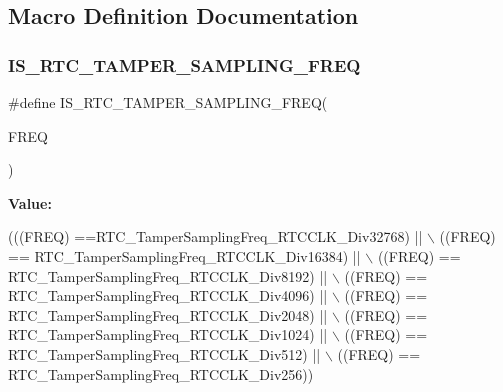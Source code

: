 \subsection{Macro Definition Documentation}
\mbox{\label{group__RTC__Tamper__Sampling__Frequencies__Definitions_gaf355fb7bd95d7cffb14a212b4507cbdb}} 
\subsubsection{I\+S\+\_\+\+R\+T\+C\+\_\+\+T\+A\+M\+P\+E\+R\+\_\+\+S\+A\+M\+P\+L\+I\+N\+G\+\_\+\+F\+R\+EQ}
{\footnotesize\ttfamily \#define I\+S\+\_\+\+R\+T\+C\+\_\+\+T\+A\+M\+P\+E\+R\+\_\+\+S\+A\+M\+P\+L\+I\+N\+G\+\_\+\+F\+R\+EQ(\begin{DoxyParamCaption}\item[{}]{F\+R\+EQ }\end{DoxyParamCaption})}

{\bfseries Value\+:}
\begin{DoxyCode}
(((FREQ) ==RTC_TamperSamplingFreq_RTCCLK_Div32768) || \(\backslash\)
                                           ((FREQ) ==
      RTC_TamperSamplingFreq_RTCCLK_Div16384) || \(\backslash\)
                                           ((FREQ) ==
      RTC_TamperSamplingFreq_RTCCLK_Div8192) || \(\backslash\)
                                           ((FREQ) ==
      RTC_TamperSamplingFreq_RTCCLK_Div4096) || \(\backslash\)
                                           ((FREQ) ==
      RTC_TamperSamplingFreq_RTCCLK_Div2048) || \(\backslash\)
                                           ((FREQ) ==
      RTC_TamperSamplingFreq_RTCCLK_Div1024) || \(\backslash\)
                                           ((FREQ) ==
      RTC_TamperSamplingFreq_RTCCLK_Div512) || \(\backslash\)
                                           ((FREQ) ==
      RTC_TamperSamplingFreq_RTCCLK_Div256))
\end{DoxyCode}


